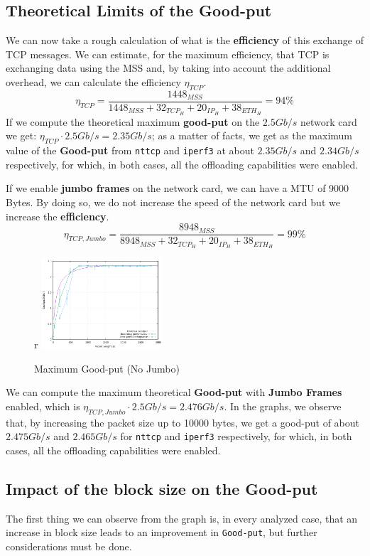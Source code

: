 \documentclass{exam}
\begin{document}
\subsection{Theoretical Limits of the Good-put} 
We can now take a rough calculation of what is the \textbf{efficiency} of this exchange of TCP messages. We can estimate, for the maximum efficiency, that TCP is exchanging data using the MSS and, by taking into account the additional overhead, we can calculate the efficiency $\eta_{TCP}$.
\[
\eta_{TCP} = \frac{1448_{MSS}}{1448_{MSS} + 32_{TCP_H} + 20_{IP_H} + 38_{ETH_H}} = 94\%
\]
If we compute the theoretical maximum \textbf{good-put} on the $2.5 Gb/s$ network card we get: $\eta_{TCP} \cdot 2.5 Gb/s = 2.35 Gb/s$; as a matter of facts, we get as the maximum value of the \textbf{Good-put} from \texttt{nttcp} and \texttt{iperf3} at about $2.35 Gb/s$ and $2.34 Gb/s$ respectively, for which, in both cases, all the offloading capabilities were enabled.

If we enable \textbf{jumbo frames} on the network card, we can have a MTU of 9000 Bytes. By doing so, we do not increase the speed of the network card but we increase the \textbf{efficiency}.
\[
\eta_{TCP,Jumbo} = \frac{8948_{MSS}}{8948_{MSS} + 32_{TCP_H} + 20_{IP_H} + 38_{ETH_H}} = 99\%
\]
\begin{figure}{r}
    \centering
    \includegraphics[width=0.40\textwidth]{maximum-goodput.png}
    \caption{Maximum Good-put (No Jumbo)}
    \label{fig:maximum-goodput}
\end{figure}
We can compute the maximum theoretical \textbf{Good-put} with \textbf{Jumbo Frames} enabled, which is $\eta_{TCP,Jumbo} \cdot 2.5 Gb/s = 2.476 Gb/s$. In the graphs, we observe that, by increasing the packet size up to 10000 bytes, we get a good-put of about $2.475 Gb/s$ and  $2.465 Gb/s$ for \texttt{nttcp} and \texttt{iperf3} respectively, for which, in both cases, all the offloading capabilities were enabled.


\subsection{Impact of the block size on the Good-put}
The first thing we can observe from the graph is, in every analyzed case, that an increase in block size leads to an improvement in \verb|Good-put|, but further considerations must be done.
\end{document}

